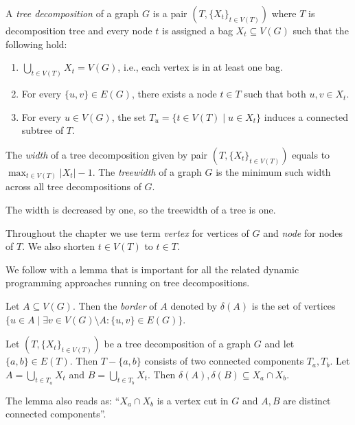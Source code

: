 %
\begin{definition}
	A \emph{tree decomposition} of a graph \( G \) is
	a pair \( (T, {\{X_t\}}_{t \in V ( T )}) \)
	where \( T \) is decomposition tree and every node \( t \)
	is assigned a bag \( X_t \subseteq V(G) \) such that the following hold:
	\begin{enumerate}
		\item \( \bigcup_{t \in V(T)} X_t = V(G) \),
		      i.e., each vertex is in at least one bag.
		\item For every \( \{u,v\} \in E(G) \), there exists
		      a node \( t \in T \) such that both \( u, v \in X_t \).
		\item For every \( u \in V(G) \),
		      the set \( T_u = \{t \in V(T) \mid u \in X_t\} \)
		      induces a connected subtree of \( T \).
	\end{enumerate}
\end{definition}
%
\begin{definition}
	The \emph{width} of a tree decomposition given by pair
	\( (T, {\{X_t\}}_{t \in V ( T )}) \)
	equals to \( \max_{t\in V(T)} |X_t| - 1 \).
	The \emph{treewidth} of a graph \( G \) is the minimum such width
	across all tree decompositions of \( G \).
\end{definition}
%
The width is decreased by one, so the treewidth of a tree is one.

Throughout the chapter we use term \emph{vertex} for vertices of \( G \)
and \emph{node} for nodes of \( T \).
We also shorten \( t \in V(T) \) to \( t \in T \).

We follow with a lemma that is important for all the related
dynamic programming approaches running on tree decompositions.
%
\begin{definition}
	Let \( A \subseteq V(G) \). Then the \emph{border} of \( A \) denoted by \( \delta(A) \)
	is the set of vertices
	\( \{u \in A \mid \exists v \in V(G) \setminus A : \{u, v\} \in E(G) \} \).
\end{definition}
%
\begin{lemma}
	Let \( (T, {\{X_t\}}_{t \in V ( T )}) \)
	be a tree decomposition of a graph \( G \)
	and let \( \{a, b\} \in E(T) \).
	Then \( T - \{a, b\} \) consists of two connected components \( T_a, T_b \).
	Let \( A = \bigcup_{t \in T_a} X_t \) and \( B = \bigcup_{t \in T_b} X_t \).
	Then \( \delta(A), \delta(B) \subseteq X_a \cap X_b \).
\end{lemma}
%
The lemma also reads as:
``\( X_a \cap X_b \) is a vertex cut in \( G \) and \( A, B \)
are distinct connected components''.

